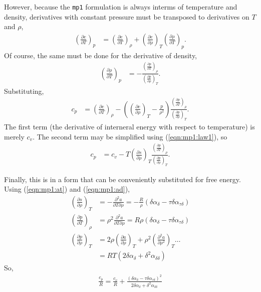 However, because the \texttt{mp1} formulation is always interms of temperature and density, derivatives with constant pressure must be transposed to derivatives on $T$ and $\rho$, 
\begin{align*}
\left(\frac{\partial e}{\partial T}\right)_p &=  \left(\frac{\partial e}{\partial T}\right)_\rho +  \left(\frac{\partial e}{\partial \rho}\right)_T  \left(\frac{\partial \rho}{\partial T}\right)_p.
\end{align*}
Of course, the same must be done for the derivative of density,
\begin{align*}
\left(\frac{\partial \rho}{\partial T}\right)_p &= -\frac{ \left(\frac{\partial p}{\partial T}\right)_\rho }{ \left(\frac{\partial p}{\partial \rho}\right)_T }.
\end{align*}
Substituting,
\begin{align*}
c_p &= \left(\frac{\partial e}{\partial T}\right)_\rho - \left(\left(\frac{\partial e}{\partial \rho}\right)_T - \frac{p}{\rho^2}\right) \frac{ \left(\frac{\partial p}{\partial T}\right)_\rho }{ \left(\frac{\partial p}{\partial \rho}\right)_T }.
\end{align*}
The first term (the derivative of interneral energy with respect to temperature) is merely $c_v$.  The second term may be simplified using (\ref{eqn:mp1:law1}), so
\begin{align*}
c_p &= c_v - T\left(\frac{\partial s}{\partial \rho}\right)_T \frac{ \left(\frac{\partial p}{\partial T}\right)_\rho }{ \left(\frac{\partial p}{\partial \rho}\right)_T }.
\end{align*}

Finally, this is in a form that can be conveniently substituted for free energy.  Using (\ref{eqn:mp1:at}) and (\ref{eqn:mp1:ad}),
\begin{align*}
\left(\frac{\partial s}{\partial \rho}\right)_T &= - \frac{\partial^2 a}{\partial T \partial \rho} = - \frac{R}{\rho}\left( \delta \alpha_\delta - \tau \delta \alpha_{\tau\delta} \right)\\
\left(\frac{\partial p}{\partial T}\right)_\rho &= \rho^2 \frac{\partial^2 a}{\partial T \partial \rho} = R \rho \left( \delta \alpha_\delta - \tau \delta \alpha_{\tau\delta} \right)\\
\left(\frac{\partial p}{\partial \rho}\right)_T &= 2 \rho \left(\frac{\partial a}{\partial \rho}\right)_T + \rho^2 \left(\frac{\partial^2 a}{\partial \rho^2}\right)_T \ldots\\
 &= RT \left( 2\delta \alpha_\delta + \delta^2 \alpha_{\delta\delta} \right)
\end{align*}
So, 
\begin{align}
\frac{c_p}{R} = \frac{c_v}{R} + \frac{\left(\delta \alpha_\delta - \tau \delta \alpha_{\tau\delta} \right)^2}{2\delta \alpha_\delta + \delta^2\alpha_{\delta\delta}}
\end{align}

